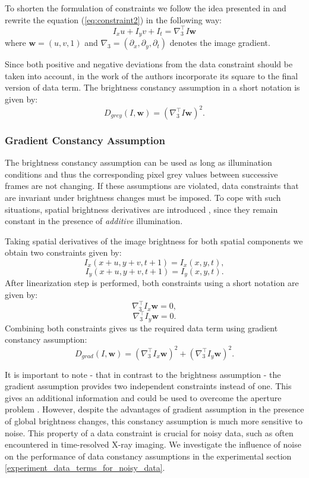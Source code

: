To shorten the formulation of \opticalflow constraints we follow the idea presented in \cite{Bruhn2006} and rewrite the equation (\ref{eq:constraint2}) in the following way:
$$ I_{x}u + I_{y}v +I_{t} = \nabla_{3}^{\top}I\textbf{w}   $$
where $ \textbf{w} = (u, v, 1)$ and $\nabla_{3} = (\partial_{x}, \partial_{y}, \partial_{t})$ denotes the image gradient.

Since both positive and negative deviations from the data constraint should be taken into account, in the work of  \cite{LucasKanade81, HornSchunck81} the authors incorporate its square to the final version of data term. The brightness constancy assumption in a short notation is given by:
$$ D_{grey}(I,\textbf{w}) = (\nabla_{3}^{\top}I\textbf{w})^2.$$



\subsubsection{Gradient Constancy Assumption}
\label{gradient}

The brightness constancy assumption can be used as long as illumination conditions and thus the corresponding pixel grey values between successive frames are not changing. If these assumptions are violated, data constraints that are invariant under brightness changes must be imposed.  To cope with such situations, spatial brightness derivatives are introduced \cite{Uras88, Schnorr93, Brox04, Papenberg06}, since they remain constant in the presence of \textit{additive} illumination.

Taking spatial derivatives of the image brightness for both spatial components we obtain two constraints given by:
$$ I_{x}(x+u, y+v, t+1) = I_{x}(x,y,t), $$
$$ I_{y}(x+u, y+v, t+1) = I_{y}(x,y,t). $$
After linearization step is performed, both constraints using a short notation are given by:
$$ \nabla_{3}^{\top}I_{x}\textbf{w} = 0, $$
$$ \nabla_{3}^{\top}I_{y}\textbf{w} = 0. $$
Combining both constraints gives us the required data term using gradient constancy assumption:
$$ D_{grad}(I,\textbf{w}) = (\nabla_{3}^{\top}I_{x}\textbf{w})^2 + (\nabla_{3}^{\top}I_{y}\textbf{w})^2. $$

It is important to note - that in contrast to the brightness assumption - the gradient assumption provides two independent constraints instead of one. This gives an additional information and could be used to overcome the aperture problem \cite{HornSchunck81}.
However, despite the advantages of gradient assumption in the presence of global brightness changes, this constancy assumption is much more sensitive to noise.
This property of a data constraint is crucial for noisy data, such as often encountered in time-resolved X-ray imaging.  We investigate the influence of noise on the performance of data constancy assumptions in the experimental section \ref{experiment_data_terms_for_noisy_data}.



